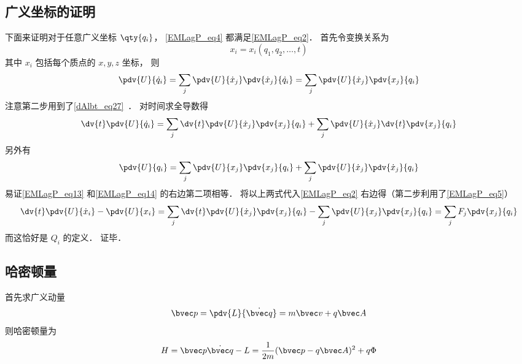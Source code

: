 \subsection{广义坐标的证明}
下面来证明对于任意广义坐标 $\qty{q_i}$， \autoref{EMLagP_eq4} 都满足\autoref{EMLagP_eq2}． 首先令变换关系为
\begin{equation}
x_i = x_i(q_1, q_2, \dots, t)
\end{equation}
其中 $x_i$ 包括每个质点的 $x, y, z$ 坐标， 则
\begin{equation}
\pdv{U}{\dot q_i} = \sum_j \pdv{U}{\dot x_j} \pdv{\dot x_j}{\dot q_i} = \sum_j \pdv{U}{\dot x_j} \pdv{x_j}{q_i}
\end{equation}
注意第二步用到了\autoref{dAlbt_eq27}~． 对时间求全导数得
\begin{equation}\label{EMLagP_eq13}
\dv{t} \pdv{U}{\dot q_i} = \sum_j \dv{t}\pdv{U}{\dot x_j} \pdv{x_j}{q_i} + \sum_j \pdv{U}{\dot x_j} \dv{t} \pdv{x_j}{q_i}
\end{equation}
另外有
\begin{equation}\label{EMLagP_eq14}
\pdv{U}{q_i} = \sum_j \pdv{U}{x_j} \pdv{x_j}{q_i} + \sum_j \pdv{U}{\dot x_j} \pdv{\dot x_j}{q_i}
\end{equation}
易证\autoref{EMLagP_eq13} 和\autoref{EMLagP_eq14} 的右边第二项相等． 将以上两式代入\autoref{EMLagP_eq2} 右边得（第二步利用了\autoref{EMLagP_eq5}）
\begin{equation}
\dv{t} \pdv{U}{\dot x_i} - \pdv{U}{x_i} =  \sum_j \dv{t}\pdv{U}{\dot x_j} \pdv{x_j}{q_i} - \sum_j \pdv{U}{x_j} \pdv{x_j}{q_i} = \sum_j F_j \pdv{x_j}{q_i}
\end{equation}
而这恰好是 $Q_i$ 的定义．%
证毕．

\subsection{哈密顿量}

首先求广义动量
\begin{equation}\label{EMLagP_eq1}
\bvec p = \pdv{L}{\dot{\bvec q}} = m\bvec v + q\bvec A
\end{equation}
则哈密顿量为
\begin{equation}
H = \bvec p \dot{\bvec q} - L = \frac{1}{2m}(\bvec p - q\bvec A)^2 + q\Phi
\end{equation}
